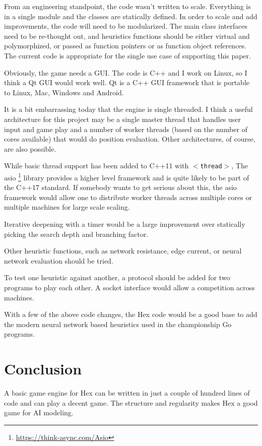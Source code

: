 \documentclass[12pt,titlepage]{amsart}
\begin{document}
From an engineering standpoint, the code wasn't written to
scale. Everything is in a single module and the classes are statically
defined.  In order to scale and add improvements, the code will need
to be modularized. The main class interfaces need to be re-thought
out, and heuristics functions should be either virtual and
polymorphized, or passed as function pointers or as function object
references.  The current code is appropriate for the single use case of
supporting this paper.

Obviously, the game needs a GUI. The code is C++ and I work on Linux, so I think
a Qt GUI \cite {Blanchette:2006} would work well. Qt is a C++ GUI framework that
is portable to Linux, Mac, Windows and Android.

It is a bit embarrassing today that the engine is single threaded. I think a
useful architecture for this project may be a single master thread that handles
user input and game play and a number of worker threads (based on the number of
cores available) that would do position evaluation. Other architectures, of
course, are also possible.

While basic thread support has been added to C++11 with \texttt{$<$thread$>$},
The asio \footnote{\url{https://think-async.com/Asio}} library provides a higher
level framework and is quite likely to be part of the C++17 standard. If
somebody wants to get serious about this, the asio framework would allow one to
distribute worker threads across multiple cores or multiple machines for large
scale scaling.

Iterative deepening with a timer would be a large improvement over statically
picking the search depth and branching factor.

Other heuristic functions, such as network resistance, edge current, or neural
network evaluation should be tried.

To test one heuristic against another, a protocol should be added for
two programs to play each other. A socket interface would allow a
competition across machines.

With a few of the above code changes, the Hex code would be a good
base to add the modern neural network based heuristics used in the
championship Go programs.

\section{Conclusion}

A basic game engine for Hex can be written in just a couple of hundred
lines of code and can play a decent game. The structure and regularity
makes Hex a good game for AI modeling.
\end{document}
